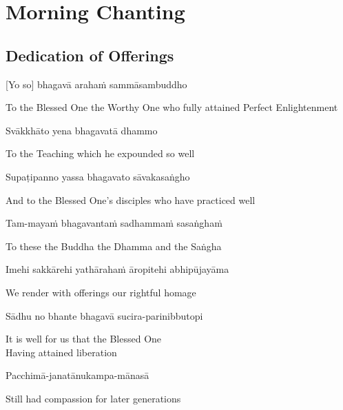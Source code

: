 
\chapter{Morning Chanting}

\section{Dedication of Offerings}

[Yo so] bhagavā arahaṁ sammāsambuddho

\begin{cprenglish}
  To the Blessed One the Worthy One who fully attained Perfect Enlightenment
\end{cprenglish}

Svākkhāto yena bhagavatā dhammo

\begin{cprenglish}
  To the Teaching which he expounded so well
\end{cprenglish}

Supaṭipanno yassa bhagavato sāvakasaṅgho

\begin{cprenglish}
  And to the Blessed One’s disciples who have practiced well
\end{cprenglish}

Tam-mayaṁ bhagavantaṁ sadhammaṁ sasaṅghaṁ

\begin{cprenglish}
  To these the Buddha the Dhamma and the Saṅgha
\end{cprenglish}

Imehi sakkārehi yathārahaṁ āropitehi abhipūjayāma

\begin{cprenglish}
  We render with offerings our rightful homage
\end{cprenglish}

Sādhu no bhante bhagavā sucira-parinibbutopi

\begin{cprenglish}
  It is well for us that the Blessed One\\
  Having attained liberation
\end{cprenglish}

Pacchimā-janatānukampa-mānasā

\begin{cprenglish}
  Still had compassion for later generations
\end{cprenglish}


